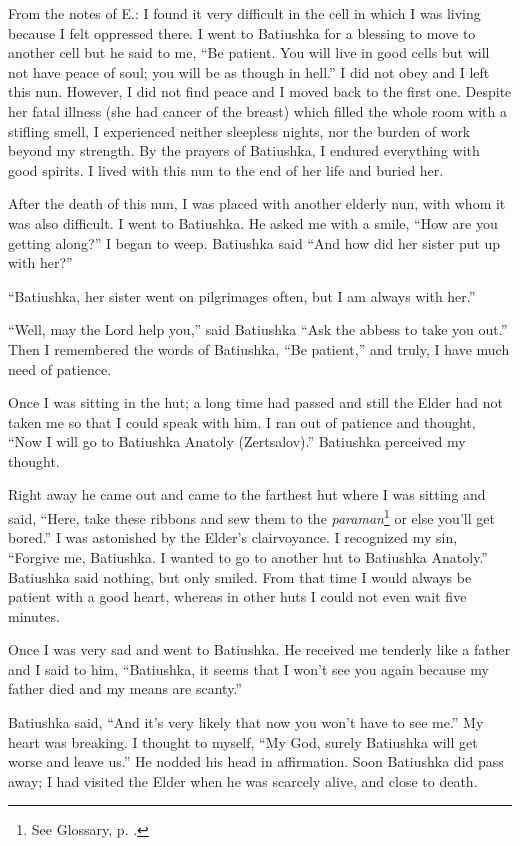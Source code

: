 \begin{longquote}{From the notes of E.: }
I found it very difficult in the cell in which I was living because I felt oppressed there. I went to Batiushka for a blessing to move to another cell but he said to me, ``Be patient. You will live in good cells but will not have peace of soul; you will be as though in hell.'' I did not obey and I left this nun. However, I did not find peace and I moved back to the first one. Despite her fatal illness (she had cancer of the breast) which filled the whole room with a stifling smell, I experienced neither sleepless nights, nor the burden of work beyond my strength. By the prayers of Batiushka, I endured everything with good spirits. I lived with this nun to the end of her life and buried her.

After the death of this nun, I was placed with another elderly nun, with whom it was also difficult. I went to Batiushka. He asked me with a smile, ``How are you getting along?'' I began to weep. Batiushka said ``And how did her sister put up with her?''

``Batiushka, her sister went on pilgrimages often, but I am always with her.''

``Well, may the Lord help you,'' said Batiushka ``Ask the abbess to take you out.'' Then I remembered the words of Batiushka, ``Be patient,'' and truly, I have much need of patience.

Once I was sitting in the hut; a long time had passed and still the Elder had not taken me so that I could speak with him. I ran out of patience and thought, ``Now I will go to Batiushka Anatoly (Zertsalov).'' Batiushka perceived my thought.

Right away he came out and came to the farthest hut where I was sitting and said, ``Here, take these ribbons and sew them to the \textit{paraman}\footnote{See Glossary, p. \pageref{paraman}.} or else you'll get bored.'' I was astonished by the Elder's clairvoyance. I recognized my sin, ``Forgive me, Batiushka. I wanted to go to another hut to Batiushka Anatoly.'' Batiushka said nothing, but only smiled. From that time I would always be patient with a good heart, whereas in other huts I could not even wait five minutes.

Once I was very sad and went to Batiushka. He received me tenderly like a father and I said to him, ``Batiushka, it seems that I won't see you again because my father died and my means are scanty.''

Batiushka said, ``And it's very likely that now you won't have to see me.'' My heart was breaking. I thought to myself, ``My God, surely Batiushka will get worse and leave us.'' He nodded his head in affirmation. Soon Batiushka did pass away; I had visited the Elder when he was scarcely alive, and close to death.
\end{longquote}

